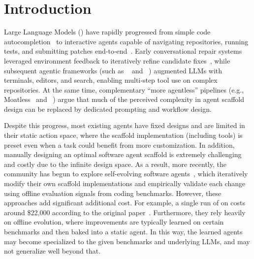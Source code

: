 

\section{Introduction}
Large Language Models () have rapidly progressed from simple code autocompletion~\cite{austin2021program,chen2021codex,li2022competition, xia2022less} to interactive agents capable of navigating repositories, running tests, and submitting patches end‑to‑end~\cite{yang2024sweagent,wang2024openhands,zhang2024autocoderover,xia2024agentless,carbonneaux2025cwm, liu2024large}.
Early conversational repair systems leveraged environment feedback to iteratively refine candidate fixes~\cite{xia2024automated}, while subsequent agentic frameworks (such as \sweagent~\cite{yang2024sweagent} and \openhands~\cite{wang2024openhands}) augmented LLMs with terminals, editors, and search, enabling multi‑step tool use on complex repositories. At the same time, complementary ``more agentless'' pipelines (e.g., Moatless~\cite{moatless} and \agentless~\cite{xia2024agentless}) argue that much of the perceived complexity in agent scaffold design can be replaced by dedicated prompting and workflow design.





Despite this progress, most existing agents have fixed designs and are limited in their static action space, where the scaffold implementation (including tools) is preset even when a task could benefit from more customization. In addition, manually designing an optimal software agent scaffold is extremely challenging and costly due to the infinite design space.
As a result, more recently, the community has begun to explore self-evolving software agents~\cite{zhang2025darwin,robeyns2025sica,wang2025huxley}, which iteratively modify their own scaffold implementations and empirically validate each change using offline evaluation signals from coding benchmarks.
However, these approaches add significant additional cost.
For example, a single run of \dgm on \swebench{} {costs} around \$22,000 according to the original paper~\cite{zhang2025darwin}.
Furthermore, they rely heavily on offline evolution, where improvements are typically learned on certain benchmarks and then baked into a static agent.
In this way, the learned agents may become specialized to the given benchmarks and underlying LLMs, and may not generalize well beyond that.


